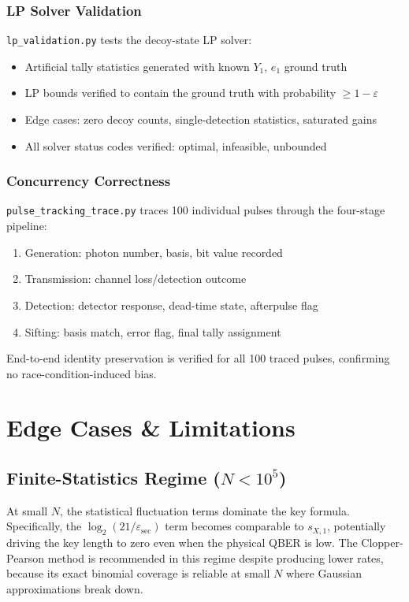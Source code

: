 \documentclass[11pt,a4paper,oneside]{report}
\begin{document}
\subsection{LP Solver Validation}

\texttt{lp\_validation.py} tests the decoy-state LP solver:
\begin{itemize}
\item Artificial tally statistics generated with known $Y_1$, $e_1$ ground truth
\item LP bounds verified to contain the ground truth with probability $\geq 1-\varepsilon$
\item Edge cases: zero decoy counts, single-detection statistics, saturated gains
\item All solver status codes verified: optimal, infeasible, unbounded
\end{itemize}

\subsection{Concurrency Correctness}

\texttt{pulse\_tracking\_trace.py} traces 100 individual pulses through the four-stage pipeline:
\begin{enumerate}
\item Generation: photon number, basis, bit value recorded
\item Transmission: channel loss/detection outcome
\item Detection: detector response, dead-time state, afterpulse flag
\item Sifting: basis match, error flag, final tally assignment
\end{enumerate}
End-to-end identity preservation is verified for all 100 traced pulses, confirming no race-condition-induced bias.


\chapter{Edge Cases \& Limitations}

\section{Finite-Statistics Regime ($N < 10^5$)}

At small $N$, the statistical fluctuation terms dominate the key formula. Specifically, the $\log_2(21/\varepsilon_{\text{sec}})$ term becomes comparable to $s_{X,1}$, potentially driving the key length to zero even when the physical QBER is low. The Clopper-Pearson method is recommended in this regime despite producing lower rates, because its exact binomial coverage is reliable at small $N$ where Gaussian approximations break down.
\end{document}
